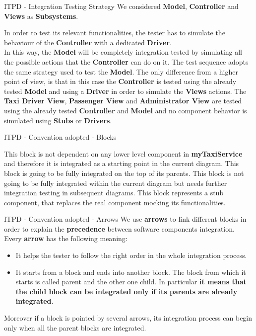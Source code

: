 \documentclass{../common/latex_classes/pdf_presentation}
\begin{document}
	\begin{frame}{ITPD - Integration Testing Strategy}
		We considered \textbf{Model}, \textbf{Controller} and \textbf{Views} as \textbf{Subsystems}. \\
		\medskip
		\begin{itemize}
			 In order to test its relevant functionalities, the tester has to simulate the behaviour of the \textbf{Controller} with a dedicated \textbf{Driver}. \\
			In this way, the \textbf{Model} will be completely integration tested by simulating all the possible actions that the \textbf{Controller} can do on it.
			 The test sequence adopts the same strategy used to test the \textbf{Model}. The only difference from a higher point of view, is that in this case the \textbf{Controller} is tested using the already tested \textbf{Model} and using a \textbf{Driver} in order to simulate the \textbf{Views} actions.
			 The \textbf{Taxi Driver View}, \textbf{Passenger View} and \textbf{Administrator View} are tested using the already tested \textbf{Controller} and \textbf{Model} and no component behavior is simulated using \textbf{Stubs} or \textbf{Drivers}.
		\end{itemize}
	\end{frame}
	\begin{frame}{ITPD - Convention adopted - Blocks}
		\begin{itemize}
			 This block is not dependent on any lower level component in \textbf{myTaxiService} and therefore it is integrated as a starting point in the current diagram.
			 This block is going to be fully integrated on the top of its parents.
			 This block is not going to be fully integrated within the current diagram but needs further integration testing in subsequent diagrams.
			 This block represents a stub component, that replaces the real component mocking its functionalities.
		\end{itemize}
	\end{frame}
	\begin{frame}{ITPD - Convention adopted - Arrows}
		We use \textbf{arrows} to link different blocks in order to explain the \textbf{precedence} between software components integration. \\
		\medskip
		Every \textbf{arrow} has the following meaning:
		\begin{itemize}
			\item It helps the tester to follow the right order in the whole integration process.
			\item It starts from a block and ends into another block. The block from which it starts is called parent and the other one child. In particular \textbf{it means that the child block can be integrated only if its parents are already integrated}.
		\end{itemize}
		\medskip
		Moreover if a block is pointed by several arrows, its integration process can begin only when all the parent blocks are integrated.
	\end{frame}
\end{document}
